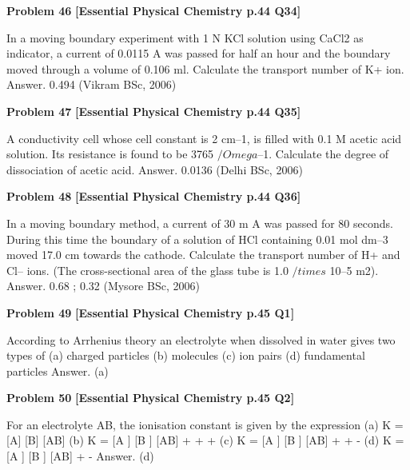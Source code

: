 \begin{problembox}
\textbf{Problem 46} \hfill \textbf{[Essential Physical Chemistry p.44 Q34]}
\label{q:ext-essential_all_questions-46}

In a moving boundary experiment with 1 N KCl solution using CaCl2 as indicator, a current of 0.0115 A
was passed for half an hour and the boundary moved through a volume of 0.106 ml.  Calculate the
transport number of K+ ion.
Answer. 0.494
(Vikram BSc, 2006)
\end{problembox}

\begin{problembox}
\textbf{Problem 47} \hfill \textbf{[Essential Physical Chemistry p.44 Q35]}
\label{q:ext-essential_all_questions-47}

A conductivity cell whose cell constant is 2 cm--1, is filled with 0.1 M acetic acid solution. Its resistance
is found to be 3765 $/Omega$--1. Calculate the degree of dissociation of acetic acid.
Answer. 0.0136
(Delhi BSc, 2006)
\end{problembox}

\begin{problembox}
\textbf{Problem 48} \hfill \textbf{[Essential Physical Chemistry p.44 Q36]}
\label{q:ext-essential_all_questions-48}

In a moving boundary method, a current of 30 m A was passed for 80 seconds. During this time the
boundary of a solution of HCl containing 0.01 mol dm--3 moved 17.0 cm towards the cathode. Calculate
the transport number of H+ and Cl-- ions. (The cross-sectional area of the glass tube is 1.0  $/times$  10--5 m2).
Answer. 0.68 ;  0.32
(Mysore BSc, 2006)
\end{problembox}

\begin{problembox}
\textbf{Problem 49} \hfill \textbf{[Essential Physical Chemistry p.45 Q1]}
\label{q:ext-essential_all_questions-49}

According to Arrhenius theory an electrolyte when dissolved in water gives two types of
(a)
charged particles
(b)
molecules
(c)
ion pairs
(d)
fundamental particles
Answer. (a)
\end{problembox}

\begin{problembox}
\textbf{Problem 50} \hfill \textbf{[Essential Physical Chemistry p.45 Q2]}
\label{q:ext-essential_all_questions-50}

For an electrolyte AB, the ionisation constant is given by the expression
(a)
K = [A] [B]
[AB]
(b)
K = [A ] [B ]
[AB]
+
+
+
(c)
K = [A ] [B ]
[AB]
+
+
-
(d)
K = [A ] [B ]
[AB]
+
-
Answer. (d)
\end{problembox}

